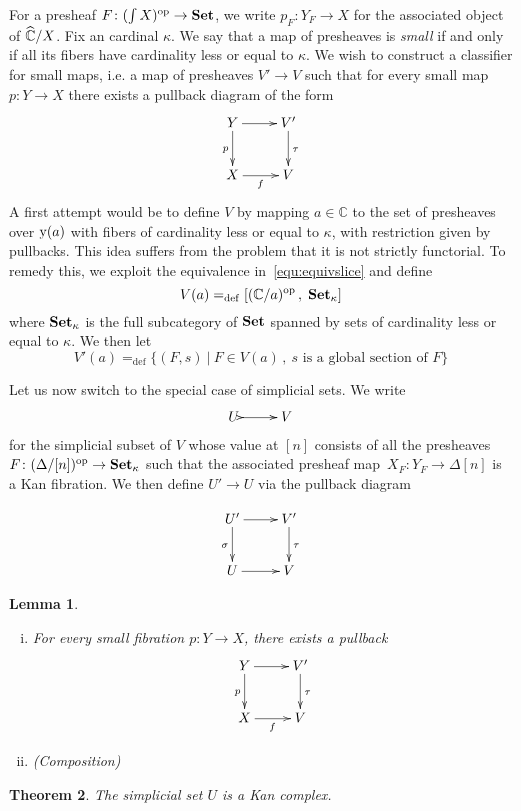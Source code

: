 \documentclass[reqno,10pt,a4paper,oneside]{amsart}
\newtheorem{theorem}{Theorem}[section]
\newtheorem{lemma}[theorem]{Lemma}
\theoremstyle{definition}
\newcommand{\defeq}{=_{\mathrm{def}}}
\newcommand{\co}{\colon}
\newcommand{\op}{\mathrm{op}}
\newcommand{\cat}[1]{\mathbb{#1}}
\newcommand{\catC}{\cat{C}}
\begin{document}
For a presheaf $F \co (\int X)^\op \to \Set$, we write $p_F \co Y_F \to X$ for the associated object of
$\pshC/X$. Fix an cardinal $\kappa$. We say that a map of presheaves is \emph{small} if and only if all its
fibers have cardinality less or equal to $\kappa$. We wish to construct a classifier for small maps,
i.e. a map of  presheaves $V' \to V$ such that for every small map $p \co Y \to X$ there 
exists a pullback diagram of the form
\[
\xymatrix{
Y \ar[r] \ar[d]_p & V' \ar[d]^{\tau} \\
X \ar[r]_f & V}
\]
A first attempt would be to define $V$ by mapping $a \in \catC$ to the set of presheaves over $\operatorname{y}(a)$
with fibers of cardinality less or equal to $\kappa$, with restriction given by pullbacks. This idea suffers
from the problem that it is not strictly functorial. To remedy this, we exploit the equivalence in~\eqref{equ:equivslice}
and define
\[
V(a)  \defeq [ (\catC/a)^\op \, ,  \; \Set_\kappa] 
\]
where $\mathbf{Set}_\kappa$ is the full subcategory of $\mathbf{Set}$ spanned by sets of cardinality less or equal to $\kappa$. We then let 
\[
V'(a)  \defeq \{ (F,s) \ | \ F \in V(a) \, , \  s \text{ is a global section of } F \}
\]

\medskip

Let us now switch to the special case of simplicial sets. We write 
\[
\xymatrix{U \ar@{>->}[r]  & V}
\] 
for the simplicial subset  of $V$ whose value at $[n]$ consists of all the presheaves $F \co  (\Delta/[n])^\op \to \Set_\kappa$ such that the
associated presheaf map~$X_F \co Y_F \to \Delta[n]$ is a Kan fibration. We then define $U' \to U$ via the 
pullback diagram

\[
\xymatrix{
U' \ar[r] \ar[d]_{\sigma} & V' \ar[d]^{\tau}  \\
U \ar[r]  & V }
\]



\begin{lemma} \hfill
\begin{enumerate}[(i)]
\item For every small fibration $p \co Y \to X$, there exists a pullback
\[
\xymatrix{
Y \ar[r] \ar[d]_p & V' \ar[d]^{\tau} \\
X \ar[r]_f & V}
\]
\item (Composition)
\end{enumerate}
\end{lemma}







\begin{theorem} The simplicial set $U$ is a Kan complex.
\end{theorem}
\end{document}
